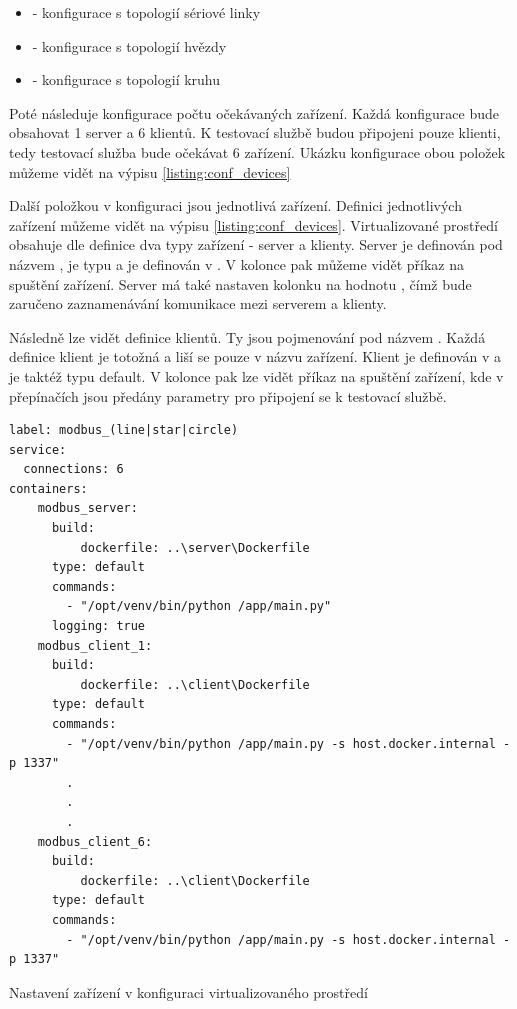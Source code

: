 \begin{itemize}
    \item {} - konfigurace s topologií sériové linky
    \item {} - konfigurace s topologií hvězdy
    \item {} - konfigurace s topologií kruhu
\end{itemize}

Poté následuje konfigurace počtu očekávaných zařízení. Každá konfigurace bude obsahovat 1 server a 6 klientů. K testovací službě budou připojeni pouze klienti, tedy testovací služba bude očekávat 6 zařízení. Ukázku konfigurace obou položek můžeme vidět na výpisu \ref{listing:conf_devices}

Další položkou v konfiguraci jsou jednotlivá zařízení. Definici jednotlivých zařízení můžeme vidět na výpisu \ref{listing:conf_devices}. Virtualizované prostředí obsahuje dle definice dva typy zařízení - server a klienty. Server je definován pod názvem , je typu  a je definován v . V kolonce  pak můžeme vidět příkaz na spuštění zařízení. Server má také nastaven kolonku  na hodnotu , čímž bude zaručeno zaznamenávání komunikace mezi serverem a klienty.

Následně lze vidět definice klientů. Ty jsou pojmenování pod názvem . Každá definice klient je totožná a liší se pouze v názvu zařízení. Klient je definován v  a je taktéž typu default. V kolonce  pak lze vidět příkaz na spuštění zařízení, kde v přepínačích jsou předány parametry pro připojení se k testovací službě.


\begin{listing}[htbp]
    \centering
    \begin{verbatim}
label: modbus_(line|star|circle)
service:
  connections: 6
containers:
    modbus_server:
      build: 
          dockerfile: ..\server\Dockerfile
      type: default
      commands:
        - "/opt/venv/bin/python /app/main.py"
      logging: true
    modbus_client_1:
      build: 
          dockerfile: ..\client\Dockerfile
      type: default
      commands:
        - "/opt/venv/bin/python /app/main.py -s host.docker.internal -p 1337"
        .
        .
        .
    modbus_client_6:
      build: 
          dockerfile: ..\client\Dockerfile
      type: default
      commands:
        - "/opt/venv/bin/python /app/main.py -s host.docker.internal -p 1337"
    \end{verbatim}
\caption{Nastavení zařízení v konfiguraci virtualizovaného prostředí}
\label{listing:conf_devices}
\end{listing}


